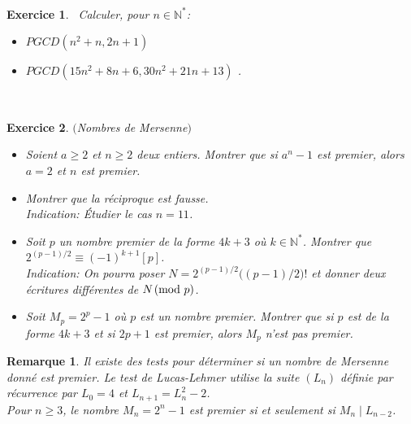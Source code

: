 \documentclass[11pt,a4paper]{article}
\newtheorem{ex}{Exercice}
\newtheorem*{rem}{Remarque}
\begin{document}
\


\begin{ex}\
Calculer, pour $n \in \mathbb{N}^*$:
\begin{itemize}
\item[•]
$ PGCD(n^2+n,2n+1)$
\item[•] $PGCD(15n^2+8n+6,30 n^2+21n+13)$ .
\end{itemize} 
\end{ex}


\


\begin{ex}$($Nombres de Mersenne$)$
\begin{itemize}
\item[$1.$] Soient $a \geqslant 2$ et $n \geqslant 2$ deux entiers. Montrer que si $a^n-1$ est premier, alors $a=2$ et $n$ est premier. 
\item[$2.$] Montrer que la réciproque est fausse.\\
\textit{Indication: Étudier le cas $n=11$.}
\item[$3.$] Soit $p$ un nombre premier de la forme $4k+3$ où $k \in \mathbb{N}^*$. Montrer que $2^{(p-1)/2}\equiv (-1)^{k+1}[p]$.\\
\textit{Indication: On pourra poser $N=2^{(p-1)/2}\big( (p-1)/2 \big)!$ et donner deux écritures différentes de $N \! \! \pmod p$. }
\item[$4.$] Soit $M_p=2^p-1$ où $p$ est un nombre premier. Montrer que si $p$ est de la forme $4k+3$ et si $2p+1$ est premier, alors $M_p$ n'est pas premier.  
\end{itemize}

\end{ex}


\begin{rem}
Il existe des tests pour déterminer si un nombre de Mersenne donné est premier. Le test de Lucas-Lehmer utilise la suite $(L_n)$ définie par récurrence par $L_0=4$ et $L_{n+1}=L_n^2-2$.\\
Pour $n \geqslant 3$, le nombre $M_n= 2^n -1$ est premier si et seulement si $M_n \mid L_{n-2}$. 
\end{rem}
\end{document}
